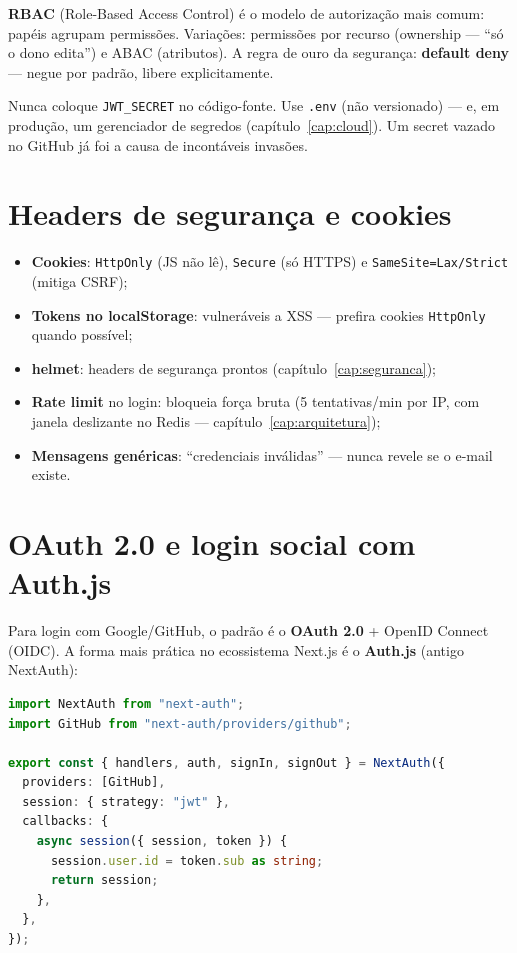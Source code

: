 \begin{caixaconceito}
\textbf{RBAC} (Role-Based Access Control) é o modelo de autorização mais
comum: papéis agrupam permissões. Variações: permissões por recurso
(ownership — ``só o dono edita'') e ABAC (atributos). A regra de ouro da
segurança: \textbf{default deny} — negue por padrão, libere explicitamente.
\end{caixaconceito}

\begin{caixaarmadilha}
Nunca coloque \texttt{JWT\_SECRET} no código-fonte. Use \texttt{.env}
(não versionado) — e, em produção, um gerenciador de segredos (capítulo~\ref{cap:cloud}).
Um secret vazado no GitHub já foi a causa de incontáveis invasões.
\end{caixaarmadilha}

\section{Headers de segurança e cookies}

\begin{itemize}[leftmargin=*, itemsep=0.4em]
  \item \textbf{Cookies}: \texttt{HttpOnly} (JS não lê), \texttt{Secure}
  (só HTTPS) e \texttt{SameSite=Lax/Strict} (mitiga CSRF);
  \item \textbf{Tokens no localStorage}: vulneráveis a XSS — prefira cookies
  \texttt{HttpOnly} quando possível;
  \item \textbf{helmet}: headers de segurança prontos (capítulo~\ref{cap:seguranca});
  \item \textbf{Rate limit} no login: bloqueia força bruta (5 tentativas/min
  por IP, com janela deslizante no Redis — capítulo~\ref{cap:arquitetura});
  \item \textbf{Mensagens genéricas}: ``credenciais inválidas'' — nunca revele
  se o e-mail existe.
\end{itemize}

\section{OAuth 2.0 e login social com Auth.js}

Para login com Google/GitHub, o padrão é o \textbf{OAuth 2.0} + OpenID Connect
(OIDC). A forma mais prática no ecossistema Next.js é o \textbf{Auth.js}
(antigo NextAuth):

\begin{lstlisting}[style=livro, language=TypeScript,
  caption={Login social com Auth.js.}, label={list:auth-oauth}]
import NextAuth from "next-auth";
import GitHub from "next-auth/providers/github";

export const { handlers, auth, signIn, signOut } = NextAuth({
  providers: [GitHub],
  session: { strategy: "jwt" },
  callbacks: {
    async session({ session, token }) {
      session.user.id = token.sub as string;
      return session;
    },
  },
});
\end{lstlisting}

